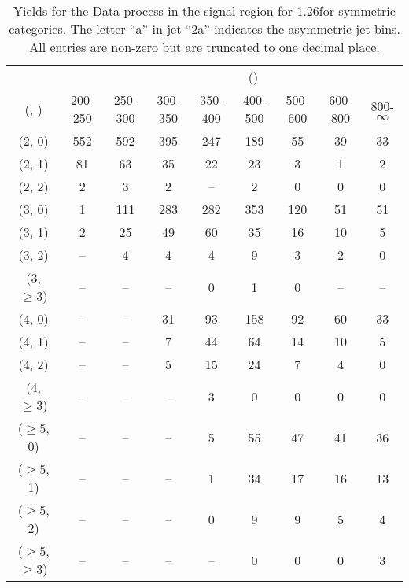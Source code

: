 \begin{table}[h!]
\tiny
\centering
\caption{Yields for the Data process in the signal region for 1.26\ifb for symmetric categories. The letter ``a'' in jet \eg ``2a''  indicates the asymmetric jet bins. All entries are non-zero but are truncated to one decimal place.\label{tab:yieldssep_sig_data_sym}}
\begin{tabular}
{ccccccccc}
	\hline\hline
&	& \multicolumn{8}{c}{\scalht (\gev)} \\ 
	 (\njet,  \nb) & 200-250 & 250-300 & 300-350 & 350-400 & 400-500 & 500-600 & 600-800 & 800-$\infty$ \\ [0.8ex] 
\hline
	(2, 0) & 552 & 592 & 395 & 247 & 189 & 55 & 39 & 33 \\[0.5ex] 
	(2, 1) & 81 & 63 & 35 & 22 & 23 & 3 & 1 & 2 \\[0.5ex] 
	(2, 2) & 2 & 3 & 2 & -- & 2 & 0 & 0 & 0 \\[0.5ex] 
	(3, 0) & 1 & 111 & 283 & 282 & 353 & 120 & 51 & 51 \\[0.5ex] 
	(3, 1) & 2 & 25 & 49 & 60 & 35 & 16 & 10 & 5 \\[0.5ex] 
	(3, 2) & -- & 4 & 4 & 4 & 9 & 3 & 2 & 0 \\[0.5ex] 
	(3, $\ge3$) & -- & -- & -- & 0 & 1 & 0 & -- & -- \\[0.5ex] 
	(4, 0) & -- & -- & 31 & 93 & 158 & 92 & 60 & 33 \\[0.5ex] 
	(4, 1) & -- & -- & 7 & 44 & 64 & 14 & 10 & 5 \\[0.5ex] 
	(4, 2) & -- & -- & 5 & 15 & 24 & 7 & 4 & 0 \\[0.5ex] 
	(4, $\ge3$) & -- & -- & -- & 3 & 0 & 0 & 0 & 0 \\[0.5ex] 
	($\ge5$, 0) & -- & -- & -- & 5 & 55 & 47 & 41 & 36 \\[0.5ex] 
	($\ge5$, 1) & -- & -- & -- & 1 & 34 & 17 & 16 & 13 \\[0.5ex] 
	($\ge5$, 2) & -- & -- & -- & 0 & 9 & 9 & 5 & 4 \\[0.5ex] 
	($\ge5$, $\ge3$) & -- & -- & -- & -- & 0 & 0 & 0 & 3 \\[0.5ex] 
	\hline
	\hline
\end{tabular}
\end{table}
